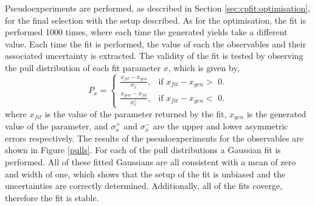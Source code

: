 Pseudoexperiments are performed, as described in Section \ref{sec:cpfit:optimisation}, for the final selection with the setup described. As for the optimisation, the \CP fit is performed 1000 times, where each time the generated yields take a different value. Each time the fit is performed, the value of each the \CP observables and their associated uncertainty is extracted. The validity of the fit is tested by observing the pull distribution of each fit parameter $x$, which is given by,
\begin{equation*}
P_x = \begin{cases}
	\frac{x_{fit} - x_{gen}}{\sigma_x^-}, & \text{if $x_{fit} - x_{gen} >$ 0}. \\
	\frac{x_{gen} - x_{fit}}{\sigma_x^+}, & \text{if $x_{fit} - x_{gen} <$ 0}.
	\end{cases}
\end{equation*}
where $x_{fit}$ is the value of the parameter returned by the fit, $x_{gen}$ is the generated value of the parameter, and $\sigma_x^+$ and $\sigma_x^-$ are the upper and lower asymmetric errors respectively. The results of the pseudoexperiments for the \CP observables are shown in Figure \ref{pulls}. For each of the pull distributions a Gaussian fit is performed. All of these fitted Gaussians are all consistent with a mean of zero and width of one, which shows that the setup of the \CP fit is unbiased and the uncertainties are correctly determined. Additionally, all of the fits coverge, therefore the fit is stable. 
 
%

